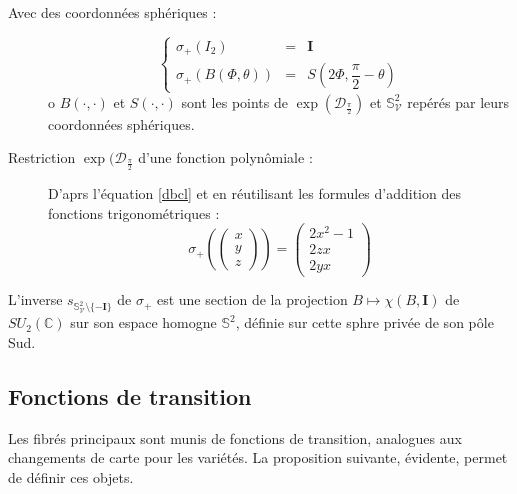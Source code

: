 \begin{description}
\item[Avec des coordonn\'ees sph\'eriques :] \[\left\{\begin{array}{rcl}\sigma_+(I_2)&=&\mathbf{I}\\%
\sigma_+(B(\Phi,\theta))&=&S\left(2\Phi,\dfrac{\pi}{2}-\theta\right)\end{array}\right.\]
o $B(\cdot,\cdot)$ et $S(\cdot,\cdot)$ sont les points de $\exp(\mathcal{D}_{\frac{\pi}{2}})$ et $\mathbb{S}_{\mathcal{V}}^2$ rep\'er\'es par leurs coordonn\'ees sph\'eriques.
%
\item[Restriction  $\exp(\mathcal{D}_{\frac{\pi}{2}}$ d'une fonction polyn\^omiale :] D'aprs l'\'equation \ref{dbcl} %
et en r\'eutilisant les formules d'addition des fonctions trigonom\'etriques :
\[\sigma_+\left(\left(\begin{array}{c}x\\y\\z\end{array}\right)\right)=\left(\begin{array}{c}2x^2-1\\2zx\\2yx\end{array}\right)\]
\end{description}

L'inverse $s_{\mathbb{S}_{\mathcal{V}}^2\setminus\{-\mathbf{I}\}}$ de $\sigma_+$ est %
une section de la projection $B\mapsto\chi(B,\mathbf{I})$ de $SU_2(\mathbb{C})$ sur son espace homogne $\mathbb{S}^2$, %
d\'efinie sur cette sphre priv\'ee de son p\^ole Sud.


\begin{comment}
\[%
\begin{array}{c}
\chi\left(\exp\mcd{0}{\overline{b}}{-b}{0},\mathbf{I}\right)=%
\mcd{\mathbf{i}\cos 2|b|}{-\mathbf{i}\frac{\overline{b}}{|b|}\sin 2|b|}{-\mathbf{i}\frac{b}{|b|}\sin 2|b|}{\mathbf{i}\cos 2|b|}%
\\%
\chi (\exp 0_2,\mathbf{I})=
\end{array}%
\]
\end{comment}

\subsection{Fonctions de transition}

Les fibr\'es principaux sont munis de fonctions de transition, analogues aux changements de carte pour les variétés. La proposition suivante, évidente, permet de définir ces objets.

